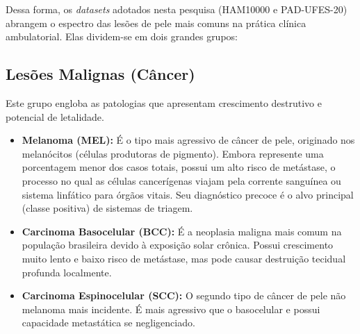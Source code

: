 \documentclass[oneside,english,brazilian]{UNISINOSmonografia}
\begin{document}
Dessa forma, os \textit{datasets} adotados nesta pesquisa (HAM10000 e PAD-UFES-20) abrangem o espectro das lesões de pele mais comuns na prática clínica ambulatorial. Elas dividem-se em dois grandes grupos:

\subsection{Lesões Malignas (Câncer)}
Este grupo engloba as patologias que apresentam crescimento destrutivo e potencial de letalidade.
\begin{itemize}
    \item \textbf{Melanoma (MEL):} É o tipo mais agressivo de câncer de pele, originado nos melanócitos (células produtoras de pigmento). Embora represente uma porcentagem menor dos casos totais, possui um alto risco de metástase, o processo no qual as células cancerígenas viajam pela corrente sanguínea ou sistema linfático para órgãos vitais. Seu diagnóstico precoce é o alvo principal (classe positiva) de sistemas de triagem.
    \item \textbf{Carcinoma Basocelular (BCC):} É a neoplasia maligna mais comum na população brasileira devido à exposição solar crônica. Possui crescimento muito lento e baixo risco de metástase, mas pode causar destruição tecidual profunda localmente.
    \item \textbf{Carcinoma Espinocelular (SCC):} O segundo tipo de câncer de pele não melanoma mais incidente. É mais agressivo que o basocelular e possui capacidade metastática se negligenciado.
\end{itemize}
\end{document}
